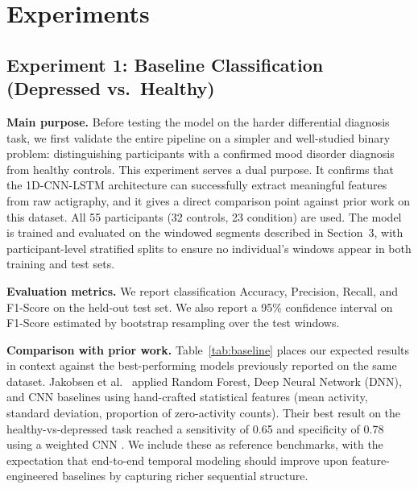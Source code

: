 \section{Experiments}

\subsection{Experiment 1: Baseline Classification (Depressed vs.\ Healthy)}

\textbf{Main purpose.}
Before testing the model on the harder differential diagnosis task, we first validate the entire pipeline on a simpler and well-studied binary problem: distinguishing participants with a confirmed mood disorder diagnosis from healthy controls. This experiment serves a dual purpose. It confirms that the 1D-CNN-LSTM architecture can successfully extract meaningful features from raw actigraphy, and it gives a direct comparison point against prior work on this dataset. All 55 participants (32 controls, 23 condition) are used. The model is trained and evaluated on the windowed segments described in Section~3, with participant-level stratified splits to ensure no individual's windows appear in both training and test sets.

\textbf{Evaluation metrics.}
We report classification Accuracy, Precision, Recall, and F1-Score on the held-out test set. We also report a 95\% confidence interval on F1-Score estimated by bootstrap resampling over the test windows.

\textbf{Comparison with prior work.}
Table~\ref{tab:baseline} places our expected results in context against the best-performing models previously reported on the same dataset. Jakobsen et al.\ \cite{jakobsen2020applying} applied Random Forest, Deep Neural Network (DNN), and CNN baselines using hand-crafted statistical features (mean activity, standard deviation, proportion of zero-activity counts). Their best result on the healthy-vs-depressed task reached a sensitivity of 0.65 and specificity of 0.78 using a weighted CNN \cite{jakobsen2020applying}. We include these as reference benchmarks, with the expectation that end-to-end temporal modeling should improve upon feature-engineered baselines by capturing richer sequential structure.

